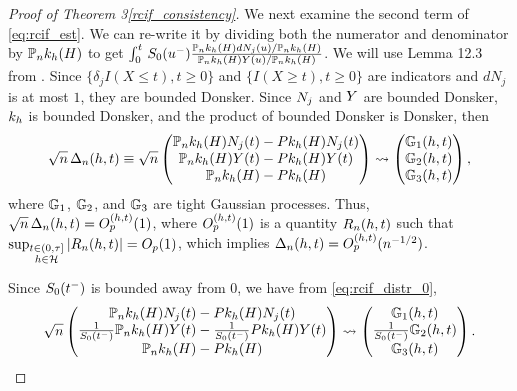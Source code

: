 {\begin{proof}[Proof of Theorem \ifnum{} 3\else \ref{rcif_consistency}\fi]
We next examine the second term of \cref{eq:rcif_est}. We can re-write it by dividing both the numerator and denominator by $\mathbb{P}_nk_h(H)$ to get $\int_0^t\, S_0(u^-) \frac{\mathbb{P}_nk_h(H) dN_j(u)/\mathbb{P}_nk_h(H)}{\mathbb{P}_nk_h(H) Y(u)/\mathbb{P}_nk_h(H)}$. We will use Lemma 12.3 from \cite{kosorok_introduction_2008}. %
Since $\{\delta_j I(X\leq t), t\ge0\}$ and $\{I(X\ge t), t\ge0\}$ are indicators and $dN_j$ is at most $1$, they are bounded Donsker. Since $N_j$ and $Y$ are bounded Donsker, $k_h$ is bounded Donsker, and the product of bounded Donsker is Donsker, then
\begin{align}
\label{eq:rcif_distr_0}
\sqrt{n} \, \Delta_n(h, t) \equiv 
    \sqrt{n} \begin{pmatrix} \mathbb{P}_nk_h(H) N_j(t) - Pk_h(H) N_j(t)\\ \mathbb{P}_n k_h(H) Y(t) - P k_h(H) Y (t) \\ \mathbb{P}_n k_h(H) - Pk_h(H) \end{pmatrix}
\rightsquigarrow
\begin{pmatrix}
    \mathbb{G}_1(h, t)\\
    \mathbb{G}_2(h, t)\\
    \mathbb{G}_3(h, t)
\end{pmatrix},
\end{align}
where $\mathbb{G}_1$, $\mathbb{G}_2$, and $\mathbb{G}_3$ are tight Gaussian processes. 
Thus, $\sqrt{n} \, \Delta_n(h, t) 
= O_p^{(h, t)}(1)$, %
where $O_p^{(h, t)}(1)$ is a quantity $R_n(h, t)$ such that $\operatorname*{\sup_{\substack{t\in(0,\tau] \\ h \in \mathcal{H}}}} \left\lvert R_n(h, t)\right\rvert = O_p(1)$, which implies $\Delta_n(h, t) = O_p^{(h, t)}(n^{-1/2})$.

\newcommand{\invtruesurv}{\frac{1}{\truesurv\argtleft}}

Since $S_0(t^-)$ is bounded away from $0$, we have from \cref{eq:rcif_distr_0},
\begin{align}
\label{eq:rcif_distr}
    \sqrtn 
\begin{pmatrix}
\Pn \kernel\argH \Nj\argt - \PkH \Nj\argt\\
 \invtruesurv \Pn \kernel\argH \atrisk\argt - \invtruesurv \PkH \atrisk \argt\\
 \PnkH - \PkH
\end{pmatrix} 
\rightsquigarrow
\begin{pmatrix}
    \Gone\arght\\
   \invtruesurv \Gtwo\arght \\
   \Gthree\arght
\end{pmatrix}.
\end{align}


\end{proof}}
